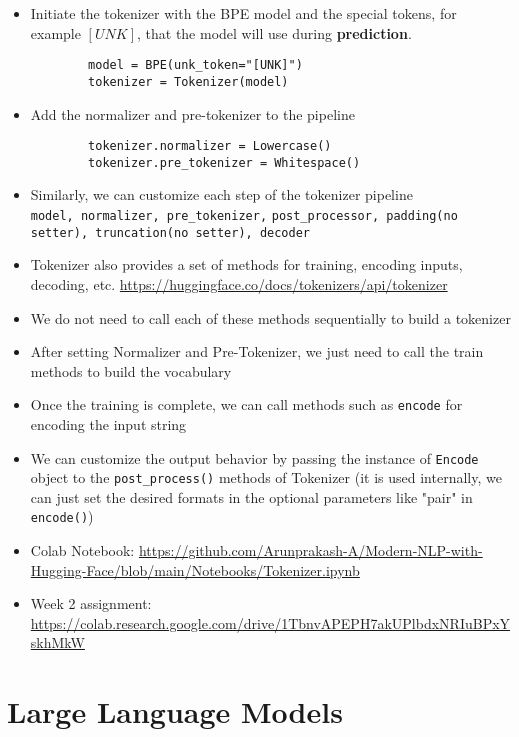 \documentclass[a4paper]{article}
\begin{document}
\begin{itemize}
    \item Initiate the tokenizer with the BPE model and the special tokens, for example $[UNK]$, that the model will use during \textbf{prediction}.
    \vspace{-1mm}
    \begin{verbatim}
        model = BPE(unk_token="[UNK]")
        tokenizer = Tokenizer(model)
    \end{verbatim}
    \vspace{-7mm}
    \item Add the normalizer and pre-tokenizer to the pipeline
    \vspace{-1mm}
    \begin{verbatim}
        tokenizer.normalizer = Lowercase()
        tokenizer.pre_tokenizer = Whitespace()
    \end{verbatim}
    \vspace{-7mm}
    \item Similarly, we can customize each step of the tokenizer pipeline\\
    \verb|model, normalizer, pre_tokenizer,|
    \verb|post_processor, padding(no setter), truncation(no setter), decoder|
    \item Tokenizer also provides a set of methods for training, encoding inputs, decoding, etc. \url{https://huggingface.co/docs/tokenizers/api/tokenizer}
    \item We do not need to call each of these methods sequentially to build a tokenizer
    \item After setting Normalizer and Pre-Tokenizer, we just need to call the train methods to build the vocabulary
    \item Once the training is complete, we can call methods such as \verb|encode| for encoding the input string
    \item We can customize the output behavior by passing the instance of \verb|Encode| object to the \verb|post_process()| methods of Tokenizer (it is used internally, we can just set the desired formats in the optional parameters like "pair" in \verb|encode()|)
    \item Colab Notebook: \url{https://github.com/Arunprakash-A/Modern-NLP-with-Hugging-Face/blob/main/Notebooks/Tokenizer.ipynb}
    \item Week 2 assignment: \url{https://colab.research.google.com/drive/1TbnvAPEPH7akUPlbdxNRIuBPxYskhMkW}
\end{itemize}

\pagebreak
\section{Large Language Models}
\end{document}
